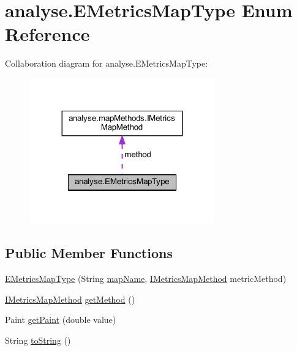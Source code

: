 \hypertarget{enumanalyse_1_1_e_metrics_map_type}{}\section{analyse.\+E\+Metrics\+Map\+Type Enum Reference}
\label{enumanalyse_1_1_e_metrics_map_type}


Collaboration diagram for analyse.\+E\+Metrics\+Map\+Type\+:
\nopagebreak
\begin{figure}[H]
\begin{center}
\leavevmode
\includegraphics[width=227pt]{enumanalyse_1_1_e_metrics_map_type__coll__graph}
\end{center}
\end{figure}
\subsection*{Public Member Functions}
\begin{DoxyCompactItemize}
\item 
\mbox{\hyperlink{enumanalyse_1_1_e_metrics_map_type_acd09a5d4af291387d883e1f6bc6d265f}{E\+Metrics\+Map\+Type}} (String \mbox{\hyperlink{enumanalyse_1_1_e_metrics_map_type_a5f7c7fcfc4cf72cf853278534f74c451}{map\+Name}}, \mbox{\hyperlink{interfaceanalyse_1_1map_methods_1_1_i_metrics_map_method}{I\+Metrics\+Map\+Method}} metric\+Method)
\item 
\mbox{\hyperlink{interfaceanalyse_1_1map_methods_1_1_i_metrics_map_method}{I\+Metrics\+Map\+Method}} \mbox{\hyperlink{enumanalyse_1_1_e_metrics_map_type_adf55461cd7840ed3c5a0d660915ef48a}{get\+Method}} ()
\item 
Paint \mbox{\hyperlink{enumanalyse_1_1_e_metrics_map_type_aab3de28ad6049093073fdcb7f7e2b55e}{get\+Paint}} (double value)
\item 
String \mbox{\hyperlink{enumanalyse_1_1_e_metrics_map_type_a2395545f51cc44261c09614d20dbbe54}{to\+String}} ()
\end{DoxyCompactItemize}
